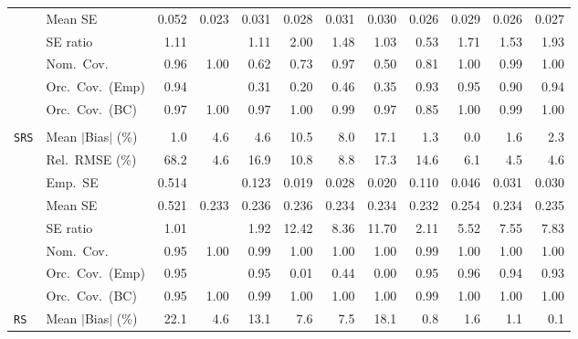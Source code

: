 \begin{landscape}
\begin{longtable}{llrrrrrrrrrr}
 & Mean SE & 0.052 & 0.023 & 0.031 & 0.028 & 0.031 & 0.030 & 0.026 & 0.029 & 0.026 & 0.027 \\
 & SE ratio & \cellcolor{ranktwo}1.11 &  & \cellcolor{rankthree}1.11 & 2.00 & 1.48 & \cellcolor{rankone}1.03 & 0.53 & 1.71 & 1.53 & 1.93 \\
 & Nom.\ Cov. & \cellcolor{rankone}0.96 & 1.00 & 0.62 & 0.73 & \cellcolor{ranktwo}0.97 & 0.50 & 0.81 & 1.00 & \cellcolor{rankthree}0.99 & 1.00 \\
 & Orc.\ Cov.\ (Emp) & \cellcolor{rankthree}0.94 &  & 0.31 & 0.20 & 0.46 & 0.35 & 0.93 & \cellcolor{rankone}0.95 & 0.90 & \cellcolor{ranktwo}0.94 \\
 & Orc.\ Cov.\ (BC) & \cellcolor{rankone}0.97 & 1.00 & \cellcolor{ranktwo}0.97 & 1.00 & 0.99 & \cellcolor{rankthree}0.97 & 0.85 & 1.00 & 0.99 & 1.00 \\
\addlinespace[2pt]
\multicolumn{12}{l}{\textbf{Binary \& Categorical Phase-One Covariates}} \\
\addlinespace[2pt]
\quad \texttt{SRS} & Mean $|$Bias$|$ (\%) & \cellcolor{ranktwo}1.0 & 4.6 & 4.6 & 10.5 & 8.0 & 17.1 & \cellcolor{rankthree}1.3 & \cellcolor{rankone}0.0 & 1.6 & 2.3 \\
 & Rel.\ RMSE (\%) & 68.2 & \cellcolor{ranktwo}4.6 & 16.9 & 10.8 & 8.8 & 17.3 & 14.6 & 6.1 & \cellcolor{rankone}4.5 & \cellcolor{rankthree}4.6 \\
 & Emp.\ SE & 0.514 &  & 0.123 & 0.019 & 0.028 & 0.020 & 0.110 & 0.046 & 0.031 & 0.030 \\
 & Mean SE & 0.521 & 0.233 & 0.236 & 0.236 & 0.234 & 0.234 & 0.232 & 0.254 & 0.234 & 0.235 \\
 & SE ratio & \cellcolor{rankone}1.01 &  & \cellcolor{ranktwo}1.92 & 12.42 & 8.36 & 11.70 & \cellcolor{rankthree}2.11 & 5.52 & 7.55 & 7.83 \\
 & Nom.\ Cov. & \cellcolor{rankone}0.95 & 1.00 & \cellcolor{ranktwo}0.99 & 1.00 & 1.00 & 1.00 & \cellcolor{rankthree}0.99 & 1.00 & 1.00 & 1.00 \\
 & Orc.\ Cov.\ (Emp) & \cellcolor{rankone}0.95 &  & \cellcolor{ranktwo}0.95 & 0.01 & 0.44 & 0.00 & \cellcolor{rankthree}0.95 & 0.96 & 0.94 & 0.93 \\
 & Orc.\ Cov.\ (BC) & \cellcolor{rankone}0.95 & 1.00 & \cellcolor{ranktwo}0.99 & 1.00 & 1.00 & 1.00 & \cellcolor{rankthree}0.99 & 1.00 & 1.00 & 1.00 \\
\addlinespace[2pt]
\quad \texttt{RS} & Mean $|$Bias$|$ (\%) & 22.1 & 4.6 & 13.1 & 7.6 & 7.5 & 18.1 & \cellcolor{ranktwo}0.8 & 1.6 & \cellcolor{rankthree}1.1 & \cellcolor{rankone}0.1 \\

\end{longtable}
\end{landscape}
